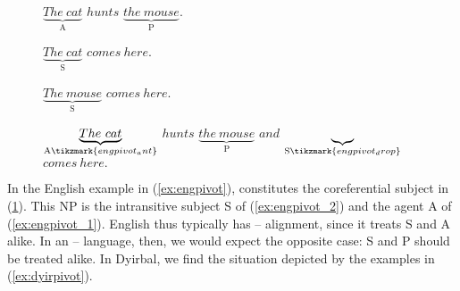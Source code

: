 \begin{figure}
\pex[belowexskip=1.75em]\label{ex:engpivot}%
	\a\label{ex:engpivot_1}%
		$\underbrace{The\ cat}_{\text{A}}$ 
		$hunts$ $\underbrace{the\ mouse}_{\text{P}}$.
	
	\a\label{ex:engpivot_2}%
		$\underbrace{The\ cat}_{\text{S}}$ $comes\ here.$
	
	\a\label{ex:engpivot_3}%
		$\underbrace{The\ mouse}_{\text{S}}$ $comes\ here.$
	
	\a\label{ex:engpivot_4}%
		$\underbrace{The\ cat}_{\text{A}\tikzmark{engpivot_ant}}$
		$hunts$
		$\underbrace{the\ mouse}_{\text{P}}$
		$and$
		$\underbrace{ }_{\text{S}\tikzmark{engpivot_drop}}$
		$comes\ here.$

\xe
\end{figure}

In the English example in (\ref{ex:engpivot}),  constitutes the
coreferential subject in (\ref{ex:engpivot_4}). This NP is the intransitive
subject S of (\ref{ex:engpivot_2}) and the agent A of (\ref{ex:engpivot_1}).
English thus typically has \Nom{}--\Acc{} alignment, since it treats S and A
alike. In an \Erg{}--\Abs{} language, then, we would expect the opposite case:
S and P should be treated alike. In Dyirbal, we find the situation depicted by
the examples in (\ref{ex:dyirpivot}).


